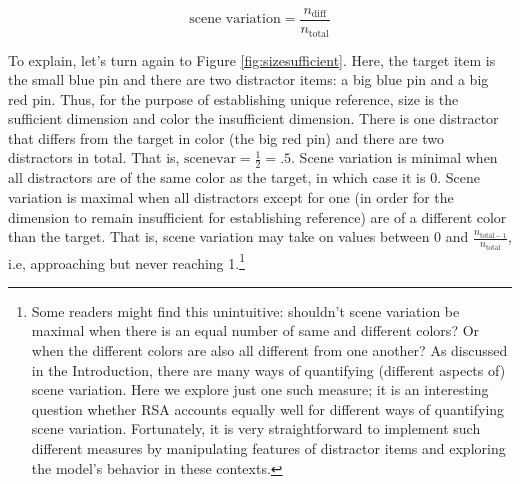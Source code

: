 \documentclass[11pt]{article}
\newcommand{\figref}[1]{Figure \ref{#1}}
\begin{document}
\begin{equation*}
	\textrm{scene variation} = \frac{n_{\textrm{diff}}}{n_{\textrm{total}}}
\end{equation*}

To explain, let's turn again to \figref{fig:sizesufficient}. Here, the target item is the small blue pin and there are two distractor items: a big blue pin and a big red pin. Thus, for the purpose of establishing unique reference, size is the sufficient dimension and color the insufficient dimension. There is one distractor that differs from the target in color (the big red pin) and there are two distractors in total. That is, $\textrm{scenevar} = \frac{1}{2} = .5$. Scene variation is minimal when all distractors are of the same color as the target, in which case it is 0. Scene variation is maximal when all distractors except for one (in order for the dimension to remain insufficient for establishing reference) are of a different color than the target. That is, scene variation may take on values between 0 and $\frac{n_{\textrm{total} - 1}}{n_{\textrm{total}}}$, i.e, approaching but never reaching 1.\footnote{Some readers might find this unintuitive: shouldn't scene variation be maximal when there is an equal number of same and different colors? Or when the different colors are also all different from one another? As discussed in the Introduction, there are many ways of quantifying (different aspects of) scene variation. Here we explore just one such measure; it is an interesting question whether RSA accounts equally well for different ways of quantifying scene variation. Fortunately, it is very straightforward to implement such different measures by manipulating features of distractor items and exploring the model's behavior in these contexts.}
\end{document}
